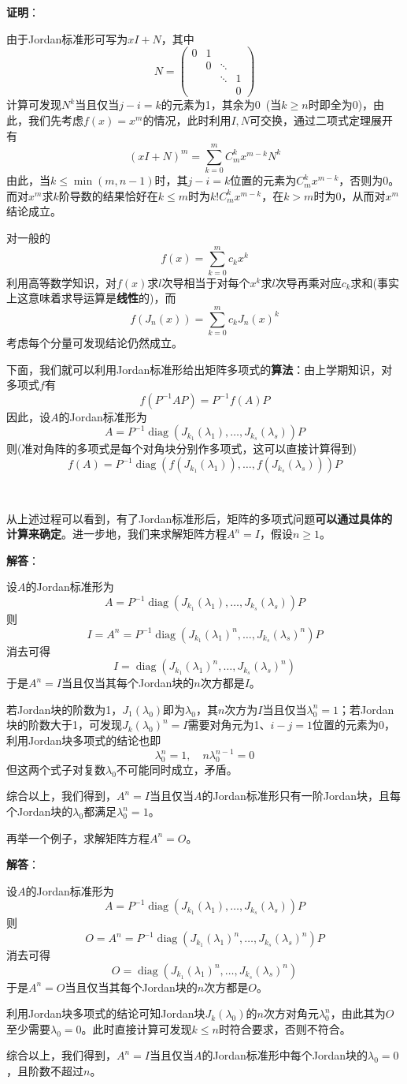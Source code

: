 \documentclass[a4paper,UTF8,fontset=windows,AutoFakeBold]{ctexart}
\DeclareMathOperator{\diag}{diag}
\newcommand{\proo}[1]{{\vspace{5pt}\kaishu\noindent\textbf{证明}：\vspace{-3pt}
\begin{compactitem}
    \item[] #1
\end{compactitem}
}}
\newcommand{\sol}[1]{{\vspace{5pt}\kaishu\noindent\textbf{解答}：\vspace{-3pt}
\begin{compactitem}
    \item[] #1
\end{compactitem}
}}
\begin{document}
\proo{
    由于Jordan标准形可写为$xI+N$，其中
    $$N=\begin{pmatrix}0&1&&\\ &0&\ddots&\\ &&\ddots&1\\ &&&0\end{pmatrix}$$
    计算可发现$N^k$当且仅当$j-i=k$的元素为1，其余为0\ (当$k\ge n$时即全为0)，由此，我们先考虑$f(x)=x^m$的情况，此时利用$I,N$可交换，通过二项式定理展开有
    $$(xI+N)^m=\sum_{k=0}^mC_m^kx^{m-k}N^k$$
    由此，当$k\le\min(m,n-1)$时，其$j-i=k$位置的元素为$C_m^kx^{m-k}$，否则为0。而对$x^m$求$k$阶导数的结果恰好在$k\le m$时为$k!C_m^kx^{m-k}$，在$k>m$时为0，从而对$x^m$结论成立。

    对一般的
    $$f(x)=\sum_{k=0}^mc_kx^k$$
    利用高等数学知识，对$f(x)$求$l$次导相当于对每个$x^k$求$l$次导再乘对应$c_k$求和(事实上这意味着求导运算是\textbf{线性}的)，而
    $$f(J_n(x))=\sum_{k=0}^mc_kJ_n(x)^k$$
    考虑每个分量可发现结论仍然成立。
}

下面，我们就可以利用Jordan标准形给出矩阵多项式的\textbf{算法}：由上学期知识，对多项式$f$有
$$f(P^{-1}AP)=P^{-1}f(A)P$$
因此，设$A$的Jordan标准形为
$$A=P^{-1}\diag(J_{k_1}(\lambda_1),\dots,J_{k_s}(\lambda_s))P$$
则(准对角阵的多项式是每个对角块分别作多项式，这可以直接计算得到)
$$f(A)=P^{-1}\diag(f(J_{k_1}(\lambda_1)),\dots,f(J_{k_s}(\lambda_s)))P$$

\

从上述过程可以看到，有了Jordan标准形后，矩阵的多项式问题\textbf{可以通过具体的计算来确定}。进一步地，我们来求解矩阵方程$A^n=I$，假设$n\ge1$。

\sol{
    设$A$的Jordan标准形为
    $$A=P^{-1}\diag(J_{k_1}(\lambda_1),\dots,J_{k_s}(\lambda_s))P$$
    则
    $$I=A^n=P^{-1}\diag(J_{k_1}(\lambda_1)^n,\dots,J_{k_s}(\lambda_s)^n)P$$
    消去可得
    $$I=\diag(J_{k_1}(\lambda_1)^n,\dots,J_{k_s}(\lambda_s)^n)$$
    于是$A^n=I$当且仅当其每个Jordan块的$n$次方都是$I$。

    若Jordan块的阶数为1，$J_1(\lambda_0)$即为$\lambda_0$，其$n$次方为$I$当且仅当$\lambda_0^n=1$；若Jordan块的阶数大于1，可发现$J_k(\lambda_0)^n=I$需要对角元为1、$i-j=1$位置的元素为0，利用Jordan块多项式的结论也即
    $$\lambda_0^n=1,\quad n\lambda_0^{n-1}=0$$
    但这两个式子对复数$\lambda_0$不可能同时成立，矛盾。

    综合以上，我们得到，$A^n=I$当且仅当$A$的Jordan标准形只有一阶Jordan块，且每个Jordan块的$\lambda_0$都满足$\lambda_0^n=1$。
}

再举一个例子，求解矩阵方程$A^n=O$。
\sol{
    设$A$的Jordan标准形为
    $$A=P^{-1}\diag(J_{k_1}(\lambda_1),\dots,J_{k_s}(\lambda_s))P$$
    则
    $$O=A^n=P^{-1}\diag(J_{k_1}(\lambda_1)^n,\dots,J_{k_s}(\lambda_s)^n)P$$
    消去可得
    $$O=\diag(J_{k_1}(\lambda_1)^n,\dots,J_{k_s}(\lambda_s)^n)$$
    于是$A^n=O$当且仅当其每个Jordan块的$n$次方都是$O$。

    利用Jordan块多项式的结论可知Jordan块$J_k(\lambda_0)$的$n$次方对角元$\lambda_0^n$，由此其为$O$至少需要$\lambda_0=0$。此时直接计算可发现$k\le n$时符合要求，否则不符合。

    综合以上，我们得到，$A^n=I$当且仅当$A$的Jordan标准形中每个Jordan块的$\lambda_0=0$，且阶数不超过$n$。
}
\end{document}
